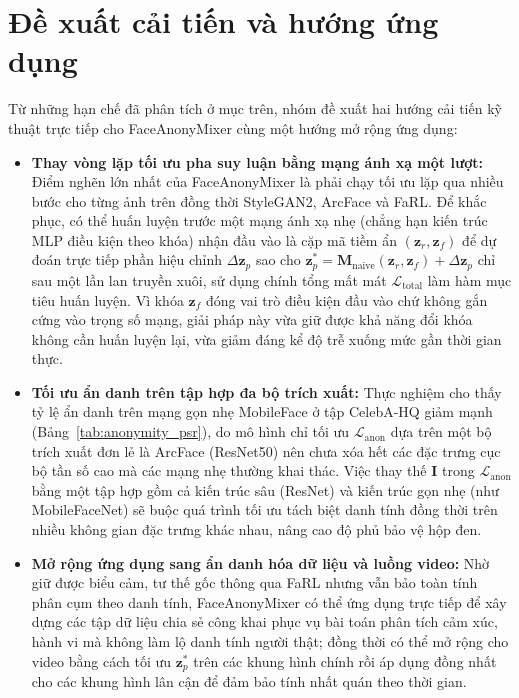 \section{Đề xuất cải tiến và hướng ứng dụng}
\label{sec::de-xuat-cai-tien}

Từ những hạn chế đã phân tích ở mục trên, nhóm đề xuất hai hướng cải tiến kỹ thuật trực tiếp cho FaceAnonyMixer cùng một hướng mở rộng ứng dụng:

\begin{itemize}\setlength{\itemsep}{3pt}\setlength{\parskip}{0pt}
    \item \textbf{Thay vòng lặp tối ưu pha suy luận bằng mạng ánh xạ một lượt:} Điểm nghẽn lớn nhất của FaceAnonyMixer là phải chạy tối ưu lặp qua nhiều bước cho từng ảnh trên đồng thời StyleGAN2, ArcFace và FaRL. Để khắc phục, có thể huấn luyện trước một mạng ánh xạ nhẹ (chẳng hạn kiến trúc MLP điều kiện theo khóa) nhận đầu vào là cặp mã tiềm ẩn $(\mathbf{z}_r, \mathbf{z}_f)$ để dự đoán trực tiếp phần hiệu chỉnh $\Delta \mathbf{z}_p$ sao cho $\mathbf{z}_p^* = \mathbf{M}_{\text{naive}}(\mathbf{z}_r, \mathbf{z}_f) + \Delta \mathbf{z}_p$ chỉ sau một lần lan truyền xuôi, sử dụng chính tổng mất mát $\mathcal{L}_{\text{total}}$ làm hàm mục tiêu huấn luyện. Vì khóa $\mathbf{z}_f$ đóng vai trò điều kiện đầu vào chứ không gắn cứng vào trọng số mạng, giải pháp này vừa giữ được khả năng đổi khóa không cần huấn luyện lại, vừa giảm đáng kể độ trễ xuống mức gần thời gian thực.

    \item \textbf{Tối ưu ẩn danh trên tập hợp đa bộ trích xuất:} Thực nghiệm cho thấy tỷ lệ ẩn danh trên mạng gọn nhẹ MobileFace ở tập CelebA-HQ giảm mạnh (Bảng~\ref{tab:anonymity_psr}), do mô hình chỉ tối ưu $\mathcal{L}_{\text{anon}}$ dựa trên một bộ trích xuất đơn lẻ là ArcFace (ResNet50) nên chưa xóa hết các đặc trưng cục bộ tần số cao mà các mạng nhẹ thường khai thác. Việc thay thế $\mathbf{I}$ trong $\mathcal{L}_{\text{anon}}$ bằng một tập hợp gồm cả kiến trúc sâu (ResNet) và kiến trúc gọn nhẹ (như MobileFaceNet) sẽ buộc quá trình tối ưu tách biệt danh tính đồng thời trên nhiều không gian đặc trưng khác nhau, nâng cao độ phủ bảo vệ hộp đen.

    \item \textbf{Mở rộng ứng dụng sang ẩn danh hóa dữ liệu và luồng video:} Nhờ giữ được biểu cảm, tư thế gốc thông qua FaRL nhưng vẫn bảo toàn tính phân cụm theo danh tính, FaceAnonyMixer có thể ứng dụng trực tiếp để xây dựng các tập dữ liệu chia sẻ công khai phục vụ bài toán phân tích cảm xúc, hành vi mà không làm lộ danh tính người thật; đồng thời có thể mở rộng cho video bằng cách tối ưu $\mathbf{z}_p^*$ trên các khung hình chính rồi áp dụng đồng nhất cho các khung hình lân cận để đảm bảo tính nhất quán theo thời gian.
\end{itemize}